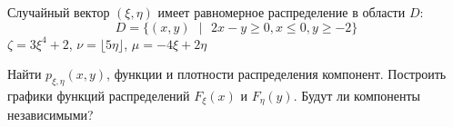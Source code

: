 
\renewcommand*{\proofname}{Решение}

Случайный вектор $(\xi,\eta)$ имеет равномерное распределение в области $D$:
\[
D = \{(x,y)\text{ }|\text{ }2x - y \ge 0, x \le 0, y \ge -2\}
\]
$\zeta = 3\xi^4 + 2$, $\nu = \lfloor 5\eta\rfloor$, $\mu = -4\xi + 2\eta$

\begin{problem}
Найти $p_{\xi,\eta}(x,y)$, функции и плотности распределения компонент. Построить графики функций распределений $F_{\xi}(x)$ и $F_{\eta}(y)$. Будут ли компоненты независимыми?
\end{problem}

